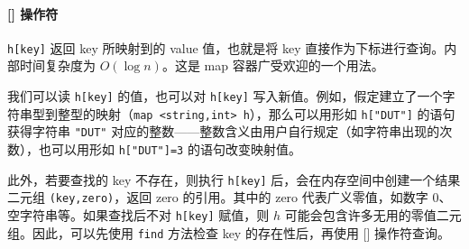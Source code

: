 \documentclass[UTF8]{ctexart}
\begin{document}
\paragraph{[] 操作符}
\verb!h[key]! 返回 key 所映射到的 value 值，也就是将 key 直接作为下标进行查询。内部时间复杂度为 $O(\log n)$。这是 map 容器广受欢迎的一个用法。

我们可以读 \verb!h[key]! 的值，也可以对 \verb!h[key]! 写入新值。例如，假定建立了一个字符串型到整型的映射（\verb!map <string,int> h!），那么可以用形如 \verb!h["DUT"]! 的语句获得字符串 \verb!"DUT"! 对应的整数——整数含义由用户自行规定（如字符串出现的次数），也可以用形如 \verb!h["DUT"]=3! 的语句改变映射值。

{\color{gray}\small 此外，若要查找的 key 不存在，则执行 \verb!h[key]! 后，会在内存空间中创建一个结果二元组 \verb!(key,zero)!，返回 zero 的引用。其中的 zero 代表广义零值，如数字 0、空字符串等。如果查找后不对 \verb!h[key]! 赋值，则 $h$ 可能会包含许多无用的零值二元组。因此，可以先使用 \verb!find! 方法检查 key 的存在性后，再使用 [] 操作符查询。}

\BgThispage
\end{document}
